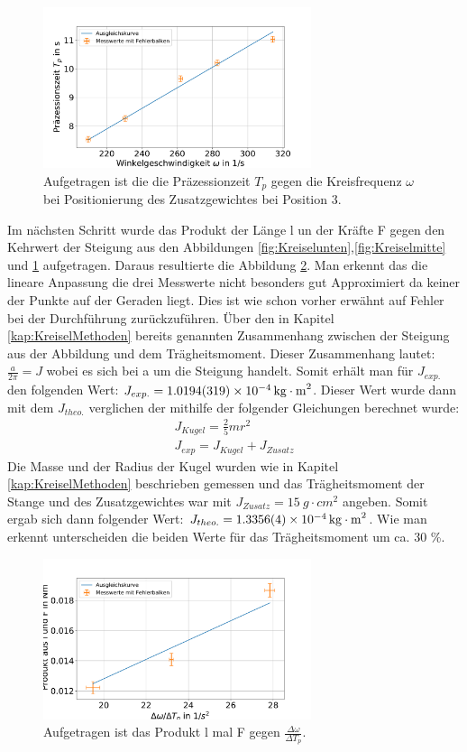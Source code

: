 \begin{figure}[h]
	\centering
	\includegraphics[width=0.7\textwidth]{res/sproHzoben.pdf}
	\caption{Aufgetragen ist die die Präzessionzeit $T_p$ gegen die Kreisfrequenz $\omega$ bei Positionierung des Zusatzgewichtes bei Position 3.}
		\label{fig:Kreiseloben}
	\end{figure}
Im nächsten Schritt wurde das Produkt der Länge l un der Kräfte F gegen den Kehrwert der Steigung aus den Abbildungen \ref{fig:Kreiselunten},\ref{fig:Kreiselmitte} und \ref{fig:Kreiseloben} aufgetragen. 
Daraus resultierte die Abbildung \ref{fig:Kreisel}.
Man erkennt das die lineare Anpassung die drei Messwerte nicht besonders gut Approximiert da keiner der Punkte auf der Geraden liegt. Dies ist wie schon vorher erwähnt auf Fehler bei der Durchführung zurückzuführen.
Über den in Kapitel \ref{kap:KreiselMethoden} bereits genannten Zusammenhang zwischen der Steigung aus der Abbildung und dem Trägheitsmoment.
Dieser Zusammenhang lautet: $\frac{a}{2\pi}=J$ wobei es sich bei a um die Steigung handelt. Somit erhält man für $J_{exp.}$ den folgenden Wert: $J_{exp.}=\SI{1,0194+-0,0319e-4}{kg \cdot m^2}$. Dieser Wert wurde dann mit dem $J_{theo.}$ verglichen der mithilfe der folgender Gleichungen berechnet wurde:
\begin{align}
	J_{Kugel}=\frac{2}{5}mr^2\\
	J_{exp}=J_{Kugel}+J_{Zusatz}
	\label{eq:J}
\end{align}
Die Masse und der Radius der Kugel wurden wie in Kapitel \ref{kap:KreiselMethoden} beschrieben gemessen und das Trägheitsmoment der Stange und des Zusatzgewichtes war mit $J_{Zusatz}=\SI{15}{g \cdot cm^2}$ angeben. Somit ergab sich dann folgender Wert: $J_{theo.}=\SI{1,3356+-0,0004e-4}{kg \cdot m^2}$. Wie man erkennt unterscheiden die beiden Werte für das Trägheitsmoment um ca. 30 \%.
\begin{figure}[h]
	\centering
	\includegraphics[width=0.7\textwidth]{res/wtgegenlF.pdf}
	\caption{Aufgetragen ist das Produkt l mal F gegen $\frac{\Delta \omega}{\Delta T_p }$.} 
	\label{fig:Kreisel}
\end{figure}
